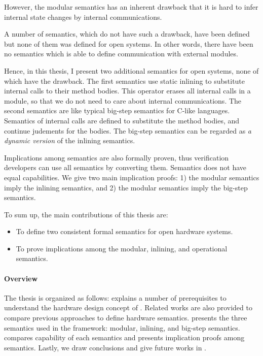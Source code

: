 However, the modular semantics has an inherent drawback that it is hard
to infer internal state changes by internal communications.


A number of semantics, which do not have such a drawback, have been
defined but none of them was defined for open systems. In other words,
there have been no semantics which is able to define communication
with external modules. 

Hence, in this thesis, I present two additional semantics for open
systems, none of which have the drawback. The first semantics use
static inlining to substitute internal calls to their method
bodies. This operator erases all internal calls in a module, so that
we do not need to care about internal communications. The second
semantics are like typical big-step semantics for C-like
languages. Semantics of internal calls are defined to substitute the
method bodies, and continue judements for the bodies. The big-step
semantics can be regarded as \emph{a dynamic version} of the inlining
semantics.

Implications among semantics are also formally proven, thus
verification developers can use all semantics by converting
them. Semantics does not have equal capabilities. We give two main
implication proofs: 1) the modular semantics imply the inlining
semantics, and 2) the modular semantics imply the big-step semantics.

To sum up, the main contributions of this thesis are:
\begin{itemize}
\item To define two consistent formal semantics for open hardware
  systems.
\item To prove implications among the modular, inlining, and
  operational semantics.
\end{itemize}

\paragraph{Overview}

The thesis is organized as follows: 
explains a number of prerequisites to understand the hardware design
concept of \Bluespec{}. Related works are also provided to compare
previous approaches to define hardware
semantics.  presents the three semantics used
in the \Kami{} framework: modular, inlining, and big-step
semantics.  compares capability of each
semantics and presents implication proofs among semantics. Lastly, we
draw conclusions and give future works in .





